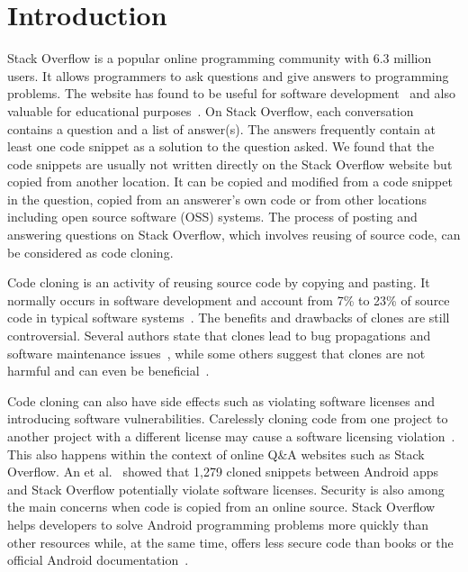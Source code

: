 \documentclass[sigconf,review, anonymous]{acmart}
\begin{document}


	
\maketitle

\section{Introduction}
Stack Overflow is a popular online programming community with 6.3 million users. It allows programmers to ask questions and give answers to programming problems. The website has found to be useful for software development~\cite{Ponzanelli2013,Ponzanelli2014,Keivanloo2014,Park2014, Stolee2014,Subramanian2013,Diamantopoulos2015,Treude2016} and also valuable for educational purposes~\cite{Nasehi2012}. On Stack Overflow, each conversation contains a question and a list of answer(s).  The answers frequently contain at least one code snippet as a solution to the question asked. We found that the code snippets are usually not written directly on the Stack Overflow website but copied from another location. It can be copied and modified from a code snippet in the question, copied from an answerer's own code or from other locations including open source software (OSS) systems. The process of posting and answering questions on Stack Overflow, which involves reusing of source code, can be considered as code cloning. 

Code cloning is an activity of reusing source code by copying and pasting. It normally occurs in software development and account from 7\% to 23\% of source code in typical software systems~\cite{Bellon2007}. The benefits and drawbacks of clones are still controversial. Several authors state that clones lead to bug propagations and software maintenance issues~\cite{Kamiya2002}, while some others suggest that clones are not harmful and can even be beneficial~\cite{Saini2016,Kapser2006}. 

Code cloning can also have side effects such as violating software licenses and introducing software vulnerabilities. Carelessly cloning code from one project to another project with a different license may cause a software licensing violation~\cite{German2009}. This also happens within the context of online Q\&A websites such as Stack Overflow. An et al.~\cite{An2017} showed that 1,279 cloned snippets between Android apps and Stack Overflow potentially violate software licenses. Security is also among the main concerns when code is copied from an online source. Stack Overflow helps developers to solve Android programming problems more quickly than other resources while, at the same time, offers less secure code than books or the official Android documentation~\cite{Acar2016}. 
\end{document}
